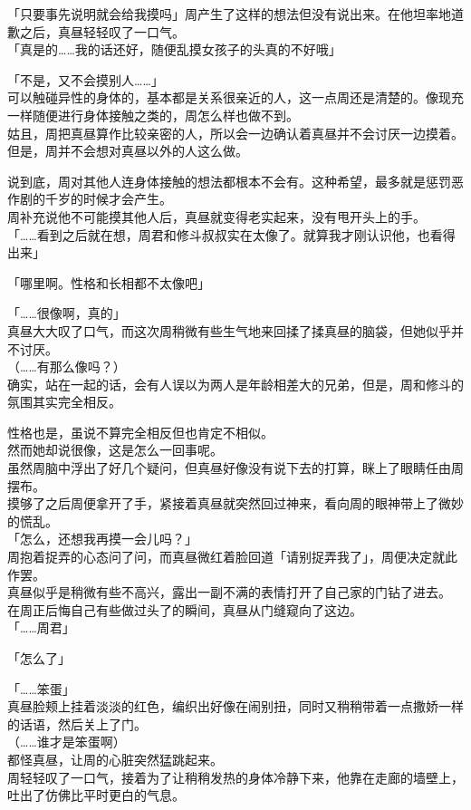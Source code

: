 「只要事先说明就会给我摸吗」周产生了这样的想法但没有说出来。在他坦率地道歉之后，真昼轻轻叹了一口气。\\

「真是的……我的话还好，随便乱摸女孩子的头真的不好哦」

「不是，又不会摸别人……」\\

可以触碰异性的身体的，基本都是关系很亲近的人，这一点周还是清楚的。像现充一样随便进行身体接触之类的，周怎么样也做不到。\\

姑且，周把真昼算作比较亲密的人，所以会一边确认着真昼并不会讨厌一边摸着。但是，周并不会想对真昼以外的人这么做。

说到底，周对其他人连身体接触的想法都根本不会有。这种希望，最多就是惩罚恶作剧的千岁的时候才会产生。\\

周补充说他不可能摸其他人后，真昼就变得老实起来，没有甩开头上的手。\\

「……看到之后就在想，周君和修斗叔叔实在太像了。就算我才刚认识他，也看得出来」

「哪里啊。性格和长相都不太像吧」

「……很像啊，真的」\\

真昼大大叹了口气，而这次周稍微有些生气地来回揉了揉真昼的脑袋，但她似乎并不讨厌。\\

（……有那么像吗？）\\

确实，站在一起的话，会有人误以为两人是年龄相差大的兄弟，但是，周和修斗的氛围其实完全相反。

性格也是，虽说不算完全相反但也肯定不相似。\\

然而她却说很像，这是怎么一回事呢。\\

虽然周脑中浮出了好几个疑问，但真昼好像没有说下去的打算，眯上了眼睛任由周摆布。\\

摸够了之后周便拿开了手，紧接着真昼就突然回过神来，看向周的眼神带上了微妙的慌乱。\\

「怎么，还想我再摸一会儿吗？」\\

周抱着捉弄的心态问了问，而真昼微红着脸回道「请别捉弄我了」，周便决定就此作罢。\\

真昼似乎是稍微有些不高兴，露出一副不满的表情打开了自己家的门钻了进去。\\

在周正后悔自己有些做过头了的瞬间，真昼从门缝窥向了这边。\\

「……周君」

「怎么了」

「……笨蛋」\\

真昼脸颊上挂着淡淡的红色，编织出好像在闹别扭，同时又稍稍带着一点撒娇一样的话语，然后关上了门。\\

（……谁才是笨蛋啊）\\

都怪真昼，让周的心脏突然猛跳起来。\\

周轻轻叹了一口气，接着为了让稍稍发热的身体冷静下来，他靠在走廊的墙壁上，吐出了仿佛比平时更白的气息。
